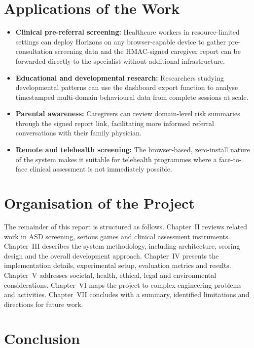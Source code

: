 \documentclass[12pt,a4paper,oneside]{report}
\begin{document}
\section{Applications of the Work}

\begin{itemize}[leftmargin=0.5in]
  \item \textbf{Clinical pre-referral screening:} Healthcare workers in resource-limited settings can deploy Horizons on any browser-capable device to gather pre-consultation screening data and the HMAC-signed caregiver report can be forwarded directly to the specialist without additional infrastructure.
  \item \textbf{Educational and developmental research:} Researchers studying developmental patterns can use the dashboard export function to analyse timestamped multi-domain behavioural data from complete sessions at scale.
  \item \textbf{Parental awareness:} Caregivers can review domain-level risk summaries through the signed report link, facilitating more informed referral conversations with their family physician.
  \item \textbf{Remote and telehealth screening:} The browser-based, zero-install nature of the system makes it suitable for telehealth programmes where a face-to-face clinical assessment is not immediately possible.
\end{itemize}

\section{Organisation of the Project}

The remainder of this report is structured as follows. Chapter~II reviews related work in ASD screening, serious games and clinical assessment instruments. Chapter~III describes the system methodology, including architecture, scoring design and the overall development approach. Chapter~IV presents the implementation details, experimental setup, evaluation metrics and results. Chapter~V addresses societal, health, ethical, legal and environmental considerations. Chapter~VI maps the project to complex engineering problems and activities. Chapter~VII concludes with a summary, identified limitations and directions for future work.

\section{Conclusion}
\end{document}
